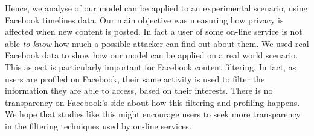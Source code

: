 Hence, we analyse of our model can be applied to an experimental scenario, using Facebook timelines data. Our main objective was measuring how privacy is affected when new content is posted. In fact a user of some on-line service is not able \emph{to know} how much a possible attacker can find out about them. We used real Facebook data to show how our model can be applied on a real world scenario. This aspect is particularly important for Facebook content filtering. In fact, as users are profiled on Facebook, their same activity is used to filter the information they are able to access, based on their interests. There is no transparency on Facebook's side about how this filtering and profiling happens. We hope that studies like this might encourage users to seek more transparency in the filtering techniques used by on-line services.
